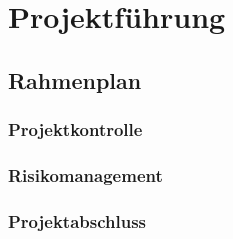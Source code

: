 \section{Projektführung}
\subsection{Rahmenplan}
\subsubsection{Projektkontrolle}

\subsubsection{Risikomanagement}

\subsubsection{Projektabschluss}
